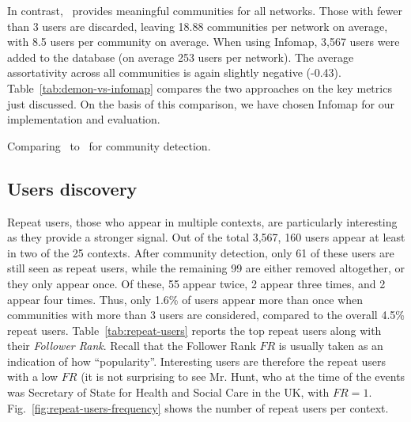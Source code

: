 In contrast, \infomap~provides meaningful communities for all networks.
Those with fewer than 3 users are discarded, leaving  18.88 communities per network on average, with 8.5 users per community on average.
When using Infomap, 3,567 users were added to the database (on average 253 users per network).
The average assortativity across all communities is again slightly negative (-0.43).
%
Table~\ref{tab:demon-vs-infomap} compares the two approaches on the key metrics just discussed. On the basis of this comparison, we have chosen Infomap for  our implementation and evaluation.

\begin{table}
	\resizebox{\textwidth}{!}{
	    
	}
	\caption{Comparing \demon~to \infomap~for community detection.}
	\label{tab:demon-vs-infomap}
\end{table}

\subsection{Users discovery}  \label{sec:users}

Repeat users, those who appear in multiple contexts, are particularly interesting as they provide a stronger signal. 
Out of the total 3,567, 160 users  appear at least in two of the 25 contexts.
After community detection, only 61 of these users are still seen as repeat users,
while the remaining 99 are either removed altogether, or they only appear once.
Of these, 55 appear twice, 2 appear three times, and 2 appear four times. 
Thus, only 1.6\% of users appear more than once when communities with more than 3 users are considered, compared to the overall 4.5\% repeat users.
%
Table~\ref{tab:repeat-users} reports the top repeat users along with their \textit{Follower Rank}.  
Recall that the Follower Rank $FR$ is usually taken as an indication of how ``popularity''. 
Interesting users are therefore the repeat users with a low $FR$  (it is not surprising to see Mr. Hunt, who at the time of the events was Secretary of State for Health and Social Care in the UK, with $FR =1.$
%
Fig.~\ref{fig:repeat-users-frequency} shows the number of repeat users per context. 

